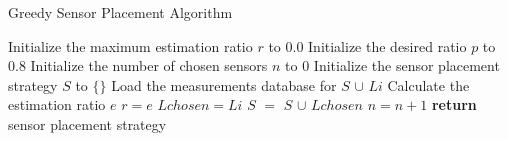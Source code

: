 \documentclass[journal]{IEEEtran}
\begin{document}
\begin{algorithm}
  \caption{Greedy Sensor Placement Algorithm}\label{alg:greedy}
  \begin{algorithmic}[1]
      \State Initialize the maximum estimation ratio $r$ to 0.0
      \State Initialize the desired ratio $p$ to 0.8
      \State Initialize the number of chosen sensors $n$ to 0
      \State Initialize the sensor placement strategy $S$ to $\{\}$
				\State Load the measurements database for $S$ $\cup$ $Li$
				\State Calculate the estimation ratio $e$
					\State $r = e$
					\State $Lchosen = Li$
				\EndIf
			\EndIf
		\EndFor
		\State $S$ $=$ $S$ $\cup$ $Lchosen$ 
		\State $n = n + 1$
      \EndWhile\label{euclidendwhile}
    \State \textbf{return} sensor placement strategy
    \EndProcedure
  \end{algorithmic}
\end{algorithm}
\end{document}
